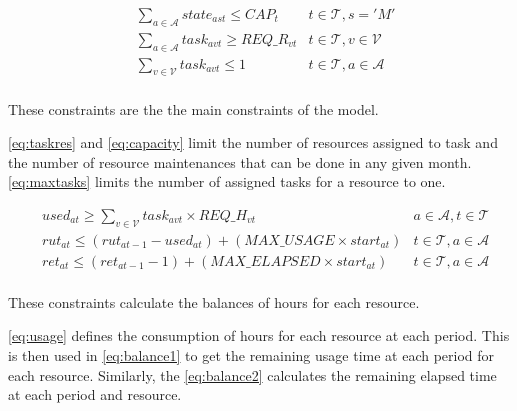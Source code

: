 \documentclass{roadef}
\begin{document}
    \begin{align}
        & \sum_{a \in \mathcal{A}} state_{ast} \leq CAP_{t}
                & t \in \mathcal{T}, s = 'M' \label{eq:capacity}\\
        & \sum_{a \in \mathcal{A}} task_{avt} \geq REQ\_R_{vt}
                & t \in \mathcal{T}, v \in \mathcal{V} \label{eq:taskres}\\
        & \sum_{v \in \mathcal{V}} task_{avt} \leq 1
                & t \in \mathcal{T}, a \in \mathcal{A} \label{eq:maxtasks}\\
    \end{align}

    These constraints are the the main constraints of the model.

    \ref{eq:taskres} and \ref{eq:capacity} limit the number of resources assigned to task and the number of resource maintenances that can be done in any given month.
    \ref{eq:maxtasks} limits the number of assigned tasks for a resource to one.
        
    \begin{align}
        & used_{at} \geq \sum_{v \in \mathcal{V}} task_{avt} \times REQ\_H_{vt}
                & a \in \mathcal{A}, t \in \mathcal{T} \label{eq:usage}\\
        & rut_{at} \leq (rut_{at-1} - used_{at}) + (MAX\_USAGE \times start_{at})
                & t \in \mathcal{T}, a \in \mathcal{A} \label{eq:balance1}\\
        & ret_{at} \leq (ret_{at-1} - 1) + (MAX\_ELAPSED \times start_{at})
                & t \in \mathcal{T}, a \in \mathcal{A} \label{eq:balance2}\\
    \end{align}
    
    These constraints calculate the balances of hours for each resource.

    \ref{eq:usage} defines the consumption of hours for each resource at each period. This is then used in \ref{eq:balance1} to get the remaining usage time at each period for each resource. Similarly, the \ref{eq:balance2} calculates the remaining elapsed time at each period and resource.        
\end{document}
